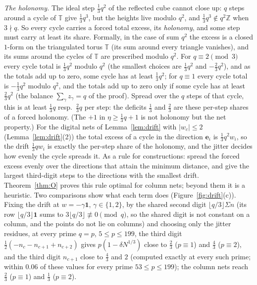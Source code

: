 \documentclass[11pt]{amsart}
\theoremstyle{definition}
\theoremstyle{plain}
\newcommand{\Z}{\mathbb{Z}}
\newcommand{\e}{\mathbf{e}}
\begin{document}
\emph{The holonomy.} The ideal step $\frac13q^2$ of the reflected cube cannot close up: $q$ steps around a cycle of $\mathbb T$ give $\frac13q^3$, but the heights live modulo $q^2$, and $\frac13q^3\notin q^2\Z$ when $3\nmid q$. So every cycle carries a forced total excess, its \emph{holonomy}, and some step must carry at least its share. Formally, in the case of sum $q^2$ the excess is a closed $1$-form on the triangulated torus $\mathbb T$ (its sum around every triangle vanishes), and its sums around the cycles of $\mathbb T$ are prescribed modulo $q^2$. For $q\equiv2\pmod3$ every cycle total is $\frac13q^2$ modulo $q^2$ (the smallest choices are $\frac13q^2$ and $-\frac23q^2$), and as the totals add up to zero, some cycle has at least $\frac13q^2$; for $q\equiv1$ every cycle total is $-\frac13q^2$ modulo $q^2$, and the totals add up to zero only if some cycle has at least $\frac23q^2$ (the balance $\sum_\gamma z_\gamma=q$ of the proof). Spread over the $q$ steps of that cycle, this is at least $\frac13q$ resp.\ $\frac23q$ per step: the deficits $\frac13$ and $\frac23$ are these per-step shares of a forced holonomy. (The $+1$ in $\eta\ge\frac13q+1$ is not holonomy but the net property.) For the digital nets of Lemma~\ref{lem:drift} with $|w_c|\le2$ (Lemma~\ref{lem:drift}(2)) the total excess of a cycle in the direction $\e_i$ is $\frac13q^2w_i$, so the drift $\frac13qw_i$ is exactly the per-step share of the holonomy, and the jitter decides how evenly the cycle spreads it. As a rule for constructions: spread the forced excess evenly over the directions that attain the minimum distance, and give the largest third-digit steps to the directions with the smallest drift. Theorem~\ref{thm:O} proves this rule optimal for column nets; beyond them it is a heuristic. Two comparisons show what each term does (Figure~\ref{fig:drift}(c)). Fixing the drift at $w=-\gamma\mathbf 1$, $\gamma\in\{1,2\}$, by the shared second digit $\lfloor q/3\rfloor\Sigma n$ (its row $\lfloor q/3\rfloor\mathbf 1$ sums to $3\lfloor q/3\rfloor\not\equiv0\pmod q$, so the shared digit is not constant on a column, and the points do not lie on columns) and choosing only the jitter residues, at every prime $q=p$, $5\le p\le199$, the third digit $\frac12(-n_c-n_{c+1}+n_{c+2})$ gives $p(1-\delta N^{1/3})$ close to $\frac23$ ($p\equiv1$) and $\frac43$ ($p\equiv2$), and the third digit $n_{c+1}$ close to $\frac43$ and $2$ (computed exactly at every such prime; within $0.06$ of these values for every prime $53\le p\le199$); the column nets reach $\frac23$ ($p\equiv1$) and $\frac13$ ($p\equiv2$).
\end{document}
